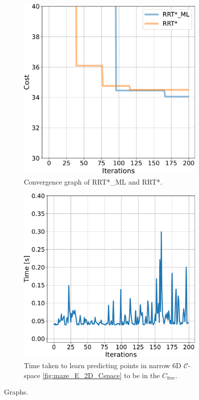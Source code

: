 \documentclass{ctuthesis}
\begin{document}
\begin{figure}[!ht]
  \centering 
  \begin{subfigure}[t]{0.49\textwidth}
    \includegraphics[width=\textwidth]{figChap5/graph_6D.pdf}  
    \caption{Convergence graph of RRT*\_ML and RRT*.}
    \label{fig:graph_6D}
  \end{subfigure}
  \begin{subfigure}[t]{0.49\textwidth}
    \includegraphics[width=\textwidth]{figChap5/graph_6D_learning.pdf}   
    \caption{Time taken to learn predicting points in narrow 6D $\mathcal{C}$-space \ref{fig:maze_E_2D_Cspace}
    to be in the \(C_{\text{free}}\).}
    \label{fig:graph_learning_time_6D}
  \end{subfigure} 
  \caption{Graphs.}
\end{figure}
\end{document}

